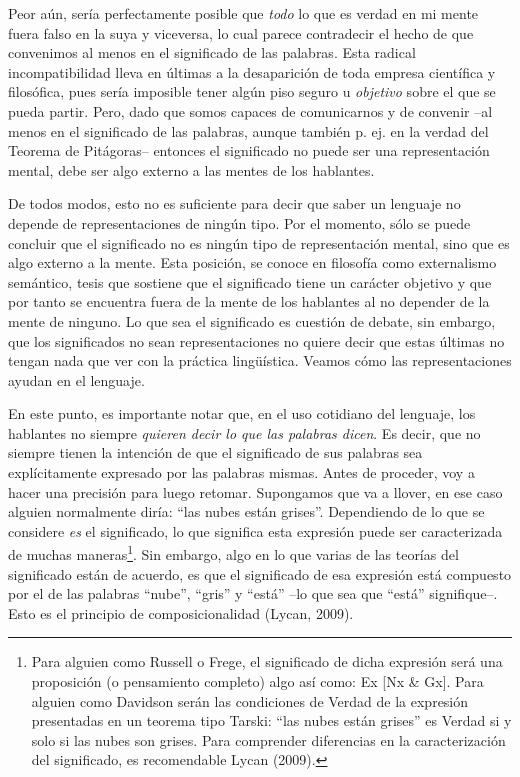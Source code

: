 \documentclass[]{book}
\begin{document}
Peor aún, sería perfectamente posible que \emph{todo} lo que es verdad
en mi mente fuera falso en la suya y viceversa, lo cual parece
contradecir el hecho de que convenimos al menos en el significado de las
palabras. Esta radical incompatibilidad lleva en últimas a la
desaparición de toda empresa científica y filosófica, pues sería
imposible tener algún piso seguro u \emph{objetivo} sobre el que se
pueda partir. Pero, dado que somos capaces de comunicarnos y de convenir
--al menos en el significado de las palabras, aunque también p. ej. en
la verdad del Teorema de Pitágoras-- entonces el significado no puede
ser una representación mental, debe ser algo externo a las mentes de los
hablantes.

De todos modos, esto no es suficiente para decir que saber un lenguaje
no depende de representaciones de ningún tipo. Por el momento, sólo se
puede concluir que el significado no es ningún tipo de representación
mental, sino que es algo externo a la mente. Esta posición, se conoce en
filosofía como externalismo semántico, tesis que sostiene que el
significado tiene un carácter objetivo y que por tanto se encuentra
fuera de la mente de los hablantes al no depender de la mente de
ninguno. Lo que sea el significado es cuestión de debate, sin embargo,
que los significados no sean representaciones no quiere decir que estas
últimas no tengan nada que ver con la práctica lingüística. Veamos cómo
las representaciones ayudan en el lenguaje.

En este punto, es importante notar que, en el uso cotidiano del
lenguaje, los hablantes no siempre \emph{quieren decir lo que las
palabras dicen}. Es decir, que no siempre tienen la intención de que el
significado de sus palabras sea explícitamente expresado por las
palabras mismas. Antes de proceder, voy a hacer una precisión para luego
retomar. Supongamos que va a llover, en ese caso alguien normalmente
diría: ``las nubes están grises''. Dependiendo de lo que se considere
\emph{es} el significado, lo que significa esta expresión puede ser
caracterizada de muchas maneras\footnote{Para alguien como Russell o
  Frege, el significado de dicha expresión será una proposición (o
  pensamiento completo) algo así como: Ex {[}Nx \& Gx{]}. Para alguien
  como Davidson serán las condiciones de Verdad de la expresión
  presentadas en un teorema tipo Tarski: ``las nubes están grises'' es
  Verdad si y solo si las nubes son grises. Para comprender diferencias
  en la caracterización del significado, es recomendable Lycan (2009).}.
Sin embargo, algo en lo que varias de las teorías del significado están
de acuerdo, es que el significado de esa expresión está compuesto por el
de las palabras ``nube'', ``gris'' y ``está'' --lo que sea que ``está''
signifique--. Esto es el principio de composicionalidad (Lycan, 2009).
\end{document}
